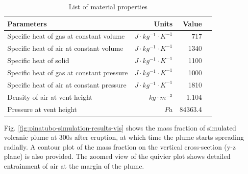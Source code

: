 \begin{table}[htp]
\centering
	\begin{centering}
      \caption{List of material properties}		
	  \begin{tabular}{lrrr}
	    \hline
	    Parameters & Units  & Value \\
	    \hline
	    	Specific heat of gas at constant volume     & $J \cdot kg^{-1}\cdot K^{-1}$& 717     \\
	    Specific heat of air at constant volume     & $J \cdot kg^{-1}\cdot K^{-1}$& 1340    \\
	    	Specific heat of solid                      & $J \cdot kg^{-1}\cdot K^{-1}$& 1100    \\
	    	Specific heat of gas at constant pressure   & $J \cdot kg^{-1}\cdot K^{-1}$& 1000    \\
	    	Specific heat of air at constant pressure   & $J \cdot kg^{-1}\cdot K^{-1}$& 1810    \\
	    	Density of air at vent height               & $kg \cdot m^{-3}$       & 1.104   \\
	    Pressure at vent height                        & $Pa$              & 84363.4 \\
	    \hline
	  \end{tabular}
	  \label{tab:material_properties}
	\end{centering}
\end{table}

Fig. \ref{fig:pinatubo-simulation-results-vis} shows the mass fraction of simulated volcanic plume at 300s after eruption, at which time the plume starts spreading radially. A contour plot of the mass fraction on the vertical cross-section (y-z plane) is also provided. The zoomed view of the quivier plot shows detailed entrainment of air at the margin of the plume.


